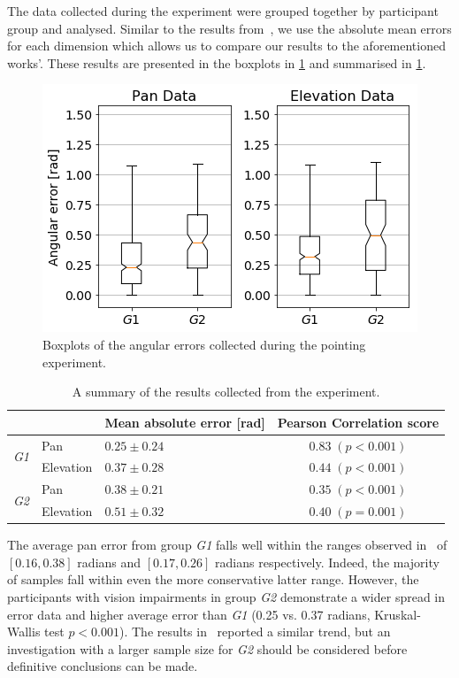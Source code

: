 \documentclass{llncs}
\begin{document}
The data collected during the experiment were grouped together by participant group and analysed.
Similar to the results from~\cite{macdonald2006spatial,schonstein2008comparison}, we use the absolute mean errors for each dimension which allows us to compare our results to the aforementioned works'. 
These results are presented in the boxplots in \cref{fig:err-results} and summarised in \cref{tab:results}.

\begin{figure}[t]
  \centering
  \includegraphics[width=0.7\columnwidth]{figures/pan_tilt_err.png}
  \caption{Boxplots of the angular errors collected during the pointing experiment. }\label{fig:err-results}
\end{figure}

\begin{table}
  \centering
  \caption{A summary of the results collected from the experiment. }\label{tab:results}
  \begin{tabular}{p{1cm}p{2cm}p{4cm}c}
    \toprule
    &           & Mean absolute error [rad]  & Pearson Correlation score \\ \midrule
    \multirow{2}{*}{\textit{G1}} & Pan       & $0.25\pm0.24$ & $0.83\;(p<0.001)$ \\
				 & Elevation & $0.37\pm0.28$ & $0.44\;(p<0.001)$ \\ \midrule
    \multirow{2}{*}{\textit{G2}} & Pan       & $0.38\pm0.21$ & $0.35\;(p<0.001)$ \\
				 & Elevation & $0.51\pm0.32$ & $0.40\;(p=0.001)$ \\
    \bottomrule
  \end{tabular}
\end{table}

The average pan error from group \textit{G1} falls well within the ranges observed in~\cite{macdonald2006spatial,schonstein2008comparison} of $[0.16, 0.38]$ radians and $[0.17, 0.26]$ radians respectively. 
Indeed, the majority of samples fall within even the more conservative latter range. 
However, the participants with vision impairments in group \textit{G2}  demonstrate a wider spread in error data and higher average error than \textit{G1} (0.25 vs. 0.37 radians, Kruskal-Wallis test $p<0.001$). 
The results in~\cite{katz2011spatial,zwiers2001spatial} reported a similar trend, but an investigation with a larger sample size for \textit{G2} should be considered before definitive conclusions can be made.
\end{document}
